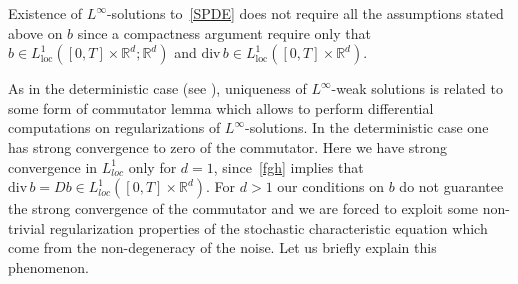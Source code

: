 \documentclass[a4paper,11pt]{article}
\begin{document}
Existence of $L^{\infty }$-solutions to~\eqref{SPDE} does not require all the assumptions stated above on $b$ since a compactness argument require only that $b\in L_{\mathrm{loc}}^{1}(\left[ 0,T\right] \times \mathbb{R}^{d};\mathbb{R}^{d})$
and $\mathrm{div}\,b\in L_{\mathrm{loc}}^{1}(\left[ 0,T\right] \times
\mathbb{R}^{d})$.

As in the deterministic case (see \cite{DiPernaLions,Ambrosio}),
uniqueness of $L^{\infty }$-weak solutions is related to some
form of commutator lemma which allows to perform differential
computations on regularizations of $L^{\infty }$-solutions. In the
deterministic case one has strong convergence to zero of the commutator.
Here we have strong convergence in $L_{loc}^{1}$ only for $d=1$, since~\eqref{fgh} implies that $%
\mathrm{div}\, b = Db\in L_{loc}^{1}\left( \left[ 0,T\right] \times {\mathbb{R}}^{d}\right) $.
For $d>1$ our conditions on $b$ do not guarantee the strong
convergence of the commutator and we are forced to exploit some
non-trivial regularization properties of the stochastic
characteristic equation which come from the non-degeneracy of the
noise. Let us briefly explain this phenomenon.
\end{document}
